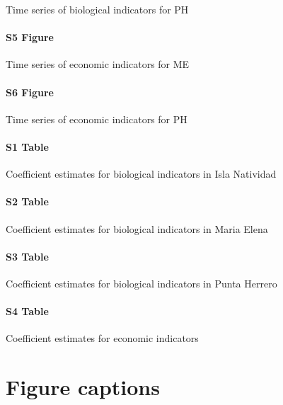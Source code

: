 \documentclass{frontiersSCNS}
\begin{document}
Time series of biological indicators for PH

\paragraph*{S5 Figure}
\label{S5_Figure}

Time series of economic indicators for ME

\paragraph*{S6 Figure}
\label{S6_Figure}

Time series of economic indicators for PH

\paragraph*{S1 Table}
\label{S1_Table}

Coefficient estimates for biological indicators in Isla Natividad

\paragraph*{S2 Table}
\label{S2_Table}

Coefficient estimates for biological indicators in Maria Elena

\paragraph*{S3 Table}
\label{S3_Table}

Coefficient estimates for biological indicators in Punta Herrero

\paragraph*{S4 Table}
\label{S4_Table}

Coefficient estimates for economic indicators



\section*{Figure captions}
\end{document}
